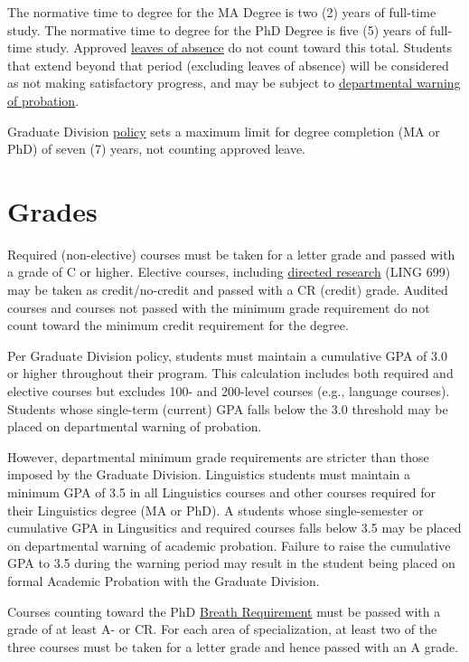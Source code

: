 \documentclass[
]{book}
\begin{document}
The normative time to degree for the MA Degree is two (2) years of full-time study. The normative time to degree for the PhD Degree is five (5) years of full-time study. Approved \hyperref[leave]{leaves of absence} do not count toward this total. Students that extend beyond that period (excluding leaves of absence) will be considered as not making satisfactory progress, and may be subject to \hyperref[probation]{departmental warning of probation}.

Graduate Division \href{https://manoa.hawaii.edu/graduate/disciplinary-actions/}{policy} sets a maximum limit for degree completion (MA or PhD) of seven (7) years, not counting approved leave.

\section{Grades}\label{grades}

Required (non-elective) courses must be taken for a letter grade and passed with a grade of C or higher. Elective courses, including \hyperref[ling699]{directed research} (LING 699) may be taken as credit/no-credit and passed with a CR (credit) grade. Audited courses and courses not passed with the minimum grade requirement do not count toward the minimum credit requirement for the degree.

Per Graduate Division policy, students must maintain a cumulative GPA of 3.0 or higher throughout their program. This calculation includes both required and elective courses but excludes 100- and 200-level courses (e.g., language courses). Students whose single-term (current) GPA falls below the 3.0 threshold may be placed on departmental warning of probation.

However, departmental minimum grade requirements are stricter than those imposed by the Graduate Division. Linguistics students must maintain a minimum GPA of 3.5 in all Linguistics courses and other courses required for their Linguistics degree (MA or PhD). A students whose single-semester or cumulative GPA in Lingusitics and required courses falls below 3.5 may be placed on departmental warning of academic probation. Failure to raise the cumulative GPA to 3.5 during the warning period may result in the student being placed on formal Academic Probation with the Graduate Division.

Courses counting toward the PhD \hyperref[breadth]{Breath Requirement} must be passed with a grade of at least A- or CR. For each area of specialization, at least two of the three courses must be taken for a letter grade and hence passed with an A grade.
\end{document}
